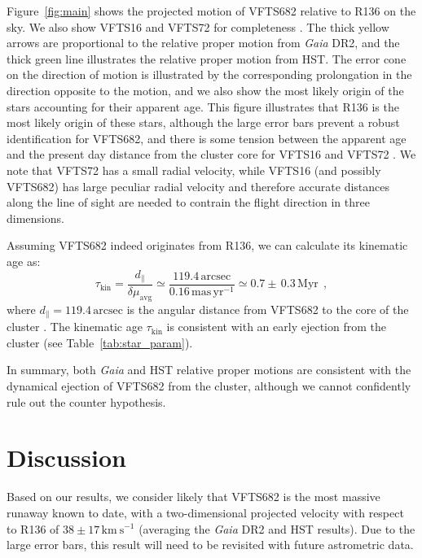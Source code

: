 \documentclass[a4paper,fleqn,usenatbib]{mnras}
\newcommand{\kms}{{\,\mathrm{km\ s^{-1}}}}
\newcommand{\masyr}{\,\mathrm{mas}\,\mathrm{yr}^{-1}}
\DeclareRobustCommand{\Tabref}[1]{Table~\ref{#1}}
\begin{document}
Figure~\ref{fig:main} shows the projected motion of VFTS682 relative to R136 on the
sky. We also show VFTS16 and VFTS72 for completeness
\citep[see][]{lennon:18}. The thick yellow arrows are proportional to
the relative proper motion from \emph{Gaia} DR2, and the thick green
line illustrates the relative proper motion from HST. The error cone
on the direction of motion is illustrated by the corresponding
prolongation in the direction opposite to the motion, and we also show
the most likely origin of the stars accounting for their apparent age.
This figure illustrates that R136 is the most likely origin of these stars, although the large error bars
prevent a robust identification for VFTS682, and there is some tension
between the apparent age and the present day distance from the cluster
core for VFTS16 and VFTS72 \citep[][]{lennon:18}. We note that
VFTS72 has a small radial velocity, while VFTS16 (and possibly VFTS682) has
large peculiar radial velocity and therefore accurate distances along
the line of sight are
needed to contrain the flight direction in three dimensions.


Assuming VFTS682 indeed originates from R136, we can calculate its kinematic
age as:
\begin{equation}
  \label{eq:kin_age}
  \tau_\mathrm{kin} = \frac{d_\parallel}{\delta\mu_\mathrm{avg}} \simeq
  \frac{119.4\,\mathrm{arcsec}}{0.16\masyr} \simeq 0.7\pm\,0.3\, \mathrm{Myr} \ \ ,
\end{equation}
where $d_\parallel = 119.4\,\mathrm{arcsec}$ is the angular distance from VFTS682 to
the core of the cluster \citep[][]{bestenlehner:11}. %
The kinematic age $\tau_\mathrm{kin}$ is consistent with an early
ejection from the cluster (see \Tabref{tab:star_param}).

In summary, both \emph{Gaia} and HST relative proper motions are consistent with the dynamical ejection of
VFTS682 from the cluster, although we cannot confidently rule out the
counter hypothesis. 

\section{Discussion}
\label{sec:discussion}

Based on our results, we consider likely that VFTS682 is the most massive
runaway known to date, with a two-dimensional
projected velocity with respect to R136 of
$38\pm17\kms$ (averaging the \emph{Gaia} DR2 and HST
results). Due to the large error bars, this result will need
to be revisited with future astrometric data. %
\end{document}
